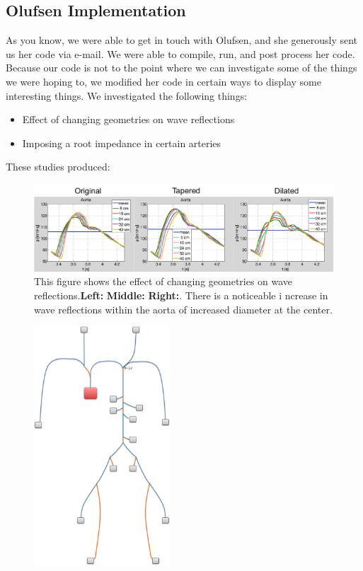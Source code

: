 \documentclass[12pt]{article}
\begin{document}
\pagebreak

\subsection{Olufsen Implementation}
As you know, we were able to get in touch with Olufsen, and she generously sent us her code via e-mail. We were able to compile, run, and post process her code. Because our code is not to the point where we can investigate some of the things we were hoping to, we modified her code in certain ways to display some interesting things. We investigated the following things:

\begin{itemize}
	\item
		Effect of changing geometries on wave reflections
	\item
		Imposing a root impedance in certain arteries
\end{itemize}

These studies produced:


\begin{figure}
	\centering
	\label{aorta}
		\includegraphics[width=6.5in]{aortawavereflections}
		\caption{This figure shows the effect of changing geometries on wave reflections.\textbf{Left:} \textbf{Middle:} \textbf{Right:}. There is a noticeable i			ncrease in wave reflections within the aorta of increased diameter at the center.}
\end{figure}

\begin{figure}
	\label{rootimpedance}
\end{figure}

\begin{figure}
	\label{fulltree}
		\includegraphics[width=2in]{fulltree}
\end{figure}
\end{document}
